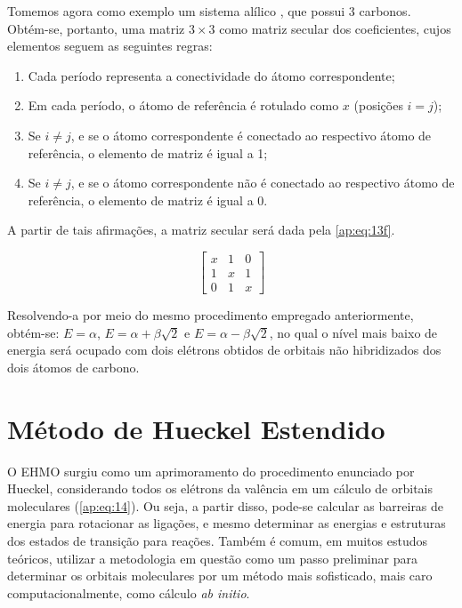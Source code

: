 Tomemos agora como exemplo um sistema alílico \ce{[CH_2=CH-CH_2-]}, que possui 3 carbonos. Obtém-se, portanto, uma matriz $3 \times 3$ como matriz secular dos coeficientes, cujos elementos seguem as seguintes regras:

\begin{enumerate}
    \item Cada período representa a conectividade do átomo correspondente;
    \item Em cada período, o átomo de referência é rotulado como $x$ (posições $i=j$);
    \item Se $i \neq j$, e se o átomo correspondente é conectado ao respectivo átomo de referência, o elemento de matriz é igual a 1;
    \item Se $i \neq j$, e se o átomo correspondente não é conectado ao respectivo átomo de referência, o elemento de matriz é igual a 0.
\end{enumerate}

\noindent A partir de tais afirmações, a matriz secular será dada pela \autoref{ap:eq:13f}.

\begin{equation}
\label{ap:eq:13f}
\begin{bmatrix}
    x & 1 & 0 \\
    1 & x & 1 \\
    0 & 1 & x 
\end{bmatrix}
\end{equation}

Resolvendo-a por meio do mesmo procedimento empregado anteriormente, obtém-se: $E = \alpha$, $E = \alpha + \beta \sqrt{2}$ e $E = \alpha - \beta \sqrt{2}$, no qual o nível mais baixo de energia será ocupado com dois elétrons obtidos de orbitais não hibridizados dos dois átomos de carbono.

\chapter{Método de Hueckel Estendido} \label{ap:EHMO}

O \gls{EHMO} surgiu como um aprimoramento do procedimento enunciado por Hueckel, considerando todos os elétrons da valência em um cálculo de orbitais moleculares (\autoref{ap:eq:14}). Ou seja, a partir disso, pode-se calcular as barreiras de energia para rotacionar as ligações, e mesmo determinar as energias e estruturas dos estados de transição para reações. Também é comum, em muitos estudos teóricos\autocite{Zubatiuk2021, BroJrgensen2021}, utilizar a metodologia em questão como um passo preliminar para determinar os orbitais moleculares por um método mais sofisticado, mais caro computacionalmente, como cálculo \textit{ab initio}.

